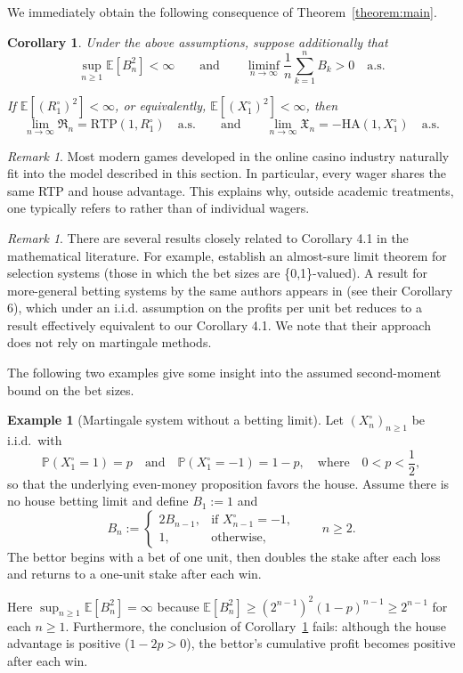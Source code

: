 \documentclass{article}
\newtheorem{corollary}[theorem]{Corollary}
\theoremstyle{definition}
\newtheorem{example}[theorem]{Example}
\theoremstyle{remark}
\newtheorem{remark}[theorem]{Remark}
\renewcommand{\P}{\mathbb{P}}
\newcommand{\E}{\mathbb{E}}
\newcommand{\RTP}{\mathrm{RTP}}
\newcommand{\HA}{\mathrm{HA}}
\begin{document}
We immediately obtain the following consequence of Theorem~\ref{theorem:main}.

\begin{corollary}\label{cor:basic}
    Under the above assumptions, suppose additionally that
\begin{equation}\label{bet-conditions}
\sup_{n \ge 1} \E[B_n^2] < \infty
\qquad\text{and}\qquad
\liminf_{n\to\infty}\frac{1}{n}\sum_{k=1}^n B_k>0\quad\text{a.s.}
\end{equation}

 If $\E[(R_1^\circ)^2] < \infty$, or equivalently, $\E[(X_1^\circ)^2] < \infty$, then
\[
\lim_{n\to\infty}\mathfrak{R}_n=\RTP(1,R_1^\circ)\quad\text{a.s.} \qquad \text{and} \qquad \lim_{n\to\infty}\mathfrak{X}_n=-\HA(1,X_1^\circ)\quad\text{a.s.}
\]
\end{corollary}


\begin{remark}
Most modern games developed in the online casino industry naturally fit into the model described in this section. In particular,  every wager shares the same RTP and house advantage. This explains why, outside academic treatments, one typically refers to  rather than of individual wagers.
\end{remark}


\begin{remark}
There are several results closely related to Corollary 4.1 in the mathematical literature. For example, \cite{LW95} establish an almost-sure limit theorem for selection systems (those in which the bet sizes are \{0,1\}-valued). A result for more-general betting systems by the same authors appears in \cite{LW03} (see their Corollary 6), which under an i.i.d. assumption on the profits per unit bet reduces to a result effectively equivalent to our Corollary 4.1. We note that their approach does not rely on martingale methods.
\end{remark}

The following two examples give some insight into the assumed second-moment bound on the bet sizes.

\begin{example}[Martingale system without a betting limit]
Let $(X_n^\circ)_{n\ge1}$ be i.i.d.\ with
\[
\P(X_1^\circ=1)=p\quad\text{and}\quad
\P(X_1^\circ=-1)=1-p,\quad\text{where}\quad
0<p<\frac12,
\]
so that the underlying even-money proposition favors the house.  
Assume there is no house betting limit and define $B_1:=1$ and
\[
B_n:=
\begin{cases}
2B_{n-1}, &\text{if $X_{n-1}^\circ=-1$},\\[2mm]
1,        &\text{otherwise},
\end{cases}
\qquad n\ge2.
\]
The bettor begins with a bet of one unit, then doubles the stake after each loss and returns to a one-unit stake after each win.

Here $\sup_{n\ge1} \E[B_n^2]=\infty$ because $\E[B_n^2]\ge(2^{n-1})^2(1-p)^{n-1}\ge2^{n-1}$ for each $n\ge1$. 
Furthermore, the conclusion of Corollary~\ref{cor:basic} fails: although the house advantage is positive ($1-2p>0$), the bettor's cumulative profit becomes positive after each win.
\end{example}
\end{document}
